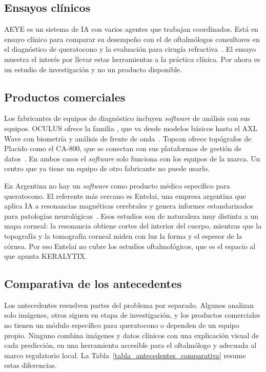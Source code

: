     \subsection*{Ensayos clínicos}

        AEYE es un sistema de IA con varios agentes que trabajan coordinados. Está en ensayo clínico para comparar su desempeño con el de oftalmólogos consultores en el diagnóstico de queratocono y la evaluación para cirugía refractiva~\cite{aeye}. El ensayo muestra el interés por llevar estas herramientas a la práctica clínica. Por ahora es un estudio de investigación y no un producto disponible.

    \subsection*{Productos comerciales}

        Los fabricantes de equipos de diagnóstico incluyen \textit{software} de análisis con sus equipos. OCULUS ofrece la familia \Pentacam{}, que va desde modelos básicos hasta el \Pentacam{} AXL Wave con biometría y análisis de frente de onda~\cite{oculus}. Topcon ofrece topógrafos de Placido como el CA-800, que se conectan con sus plataformas de gestión de datos~\cite{topcon}. En ambos casos el \textit{software} solo funciona con los equipos de la marca. Un centro que ya tiene un equipo de otro fabricante no puede usarlo.

        En Argentina no hay un \textit{software} como producto médico específico para queratocono. El referente más cercano es Entelai, una empresa argentina que aplica IA a resonancias magnéticas cerebrales y genera informes estandarizados para patologías neurológicas~\cite{entelai}. Esos estudios son de naturaleza muy distinta a un mapa corneal: la resonancia obtiene cortes del interior del cuerpo, mientras que la topografía y la tomografía corneal miden con luz la forma y el espesor de la córnea. Por eso Entelai no cubre los estudios oftalmológicos, que es el espacio al que apunta KERALYTIX.

    \subsection*{Comparativa de los antecedentes}

        Los antecedentes resuelven partes del problema por separado. Algunos analizan solo imágenes, otros siguen en etapa de investigación, y los productos comerciales no tienen un módulo específico para queratocono o dependen de un equipo propio. Ninguno combina imágenes y datos clínicos con una explicación visual de cada predicción, en una herramienta accesible para el oftalmólogo y adecuada al marco regulatorio local. La Tabla~\ref{tabla_antecedentes_comparativa} resume estas diferencias.

